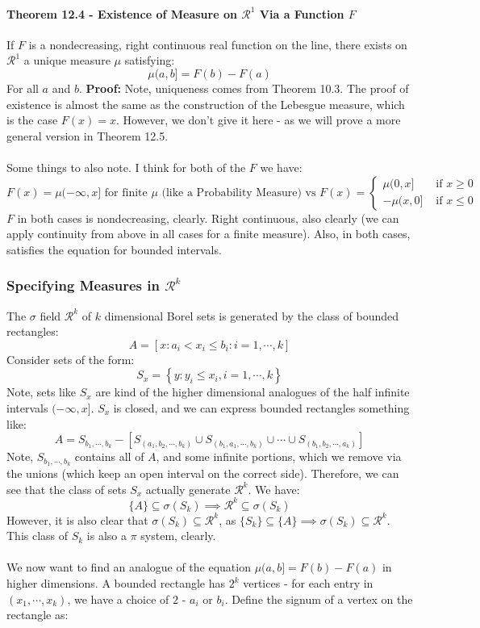 \documentclass[12pt,a4paper]{article}
\newcommand{\1}[1]{\mathbbm{1}\left\{ #1 \right\}}
\newcommand{\rcal}{\mathcal{R}}
\begin{document}
\paragraph{Theorem 12.4 - Existence of Measure on $\rcal^1$ Via a Function $F$} If $F$ is a nondecreasing, right continuous real function on the line, there exists on $\rcal^1$ a unique measure $\mu$ satisfying:
$$
	\mu(a,b] = F(b) - F(a)
$$
For all $a$ and $b$. \textbf{Proof:} Note, uniqueness comes from Theorem 10.3. The proof of existence is almost the same as the construction of the Lebesgue measure, which is the case $F(x) = x$. However, we don't give it here - as we will prove a more general version in Theorem 12.5.
\\\\
Some things to also note. I think for both of the $F$ we have:
$$
	F(x) = \mu(-\infty,x] \text{ for finite $\mu$ (like a Probability Measure) vs }
	F(x) = \begin{cases}
		\mu(0,x] & \text{ if $x \geq 0$}\\
		-\mu(x,0] & \text{ if $x \leq 0$}
	\end{cases}
$$
$F$ in both cases is nondecreasing, clearly. Right continuous, also clearly (we can apply continuity from above in all cases for a finite measure). Also, in both cases, satisfies the equation for bounded intervals.

\subsubsection{Specifying Measures in $\rcal^k$} The $\sigma$ field $\rcal^k$ of $k$ dimensional Borel sets is generated by the class of bounded rectangles:
$$
	A = \left[x: a_i < x_i \leq b_i : i = 1, \cdots, k\right]
$$
Consider sets of the form:
$$
	S_x = \left\{y : y_i \leq x_i, i = 1, \cdots, k\right\}
$$
Note, sets like $S_x$ are kind of the higher dimensional analogues of the half infinite intervals $(-\infty,x]$. $S_x$ is closed, and we can express bounded rectangles something like:
$$
	A = S_{b_1, \cdots, b_k} - 
	\left[S_{(a_1,b_2,\cdots,b_k)} \cup S_{(b_1,a_1,\cdots,b_k)} \cup \cdots \cup S_{(b_1,b_2,\cdots,a_k)}\right]
$$
Note, $S_{b_1, \cdots, b_k}$ contains all of $A$, and some infinite portions, which we remove via the unions (which keep an open interval on the correct side). Therefore, we can see that the class of sets $S_x$ actually generate $\rcal^k$. We have:
$$
	\{A\} \subseteq \sigma(S_k) \implies \rcal^k \subseteq \sigma(S_k)
$$
However, it is also clear that $\sigma(S_k) \subseteq \rcal^k$, as $\{S_k\} \subseteq \{A\} \implies \sigma(S_k) \subseteq \rcal^k$. This class of $S_k$ is also a $\pi$ system, clearly.
\\\\
We now want to find an analogue of the equation $\mu(a,b] = F(b) - F(a)$ in higher dimensions. A bounded rectangle has $2^k$ vertices - for each entry in $(x_1, \cdots, x_k)$, we have a choice of $2$ - $a_i$ or $b_i$. Define the signum of a vertex on the rectangle as:
\end{document}
